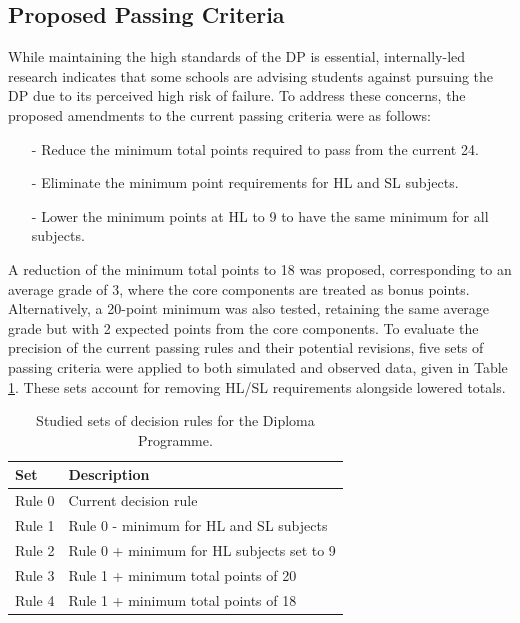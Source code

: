 \documentclass[12pt]{article}
\begin{document}
\subsection{Proposed Passing Criteria}

While maintaining the high standards of the DP is essential, internally-led research indicates that some schools are advising students against pursuing the DP due to its perceived high risk of failure. To address these concerns, the proposed amendments to the current passing criteria were as follows:

\begin{itemize}[itemsep=0pt, parsep=0pt]
    \item[-] Reduce the minimum total points required to pass from the current 24.
    \item[-] Eliminate the minimum point requirements for HL and SL subjects. 
    \item[-] Lower the minimum points at HL to 9 to have the same minimum for all subjects.
\end{itemize}

A reduction of the minimum total points to 18 was proposed, corresponding to an average grade of 3, where the core components are treated as bonus points. Alternatively, a 20-point minimum was also tested, retaining the same average grade but with 2 expected points from the core components. To evaluate the precision of the current passing rules and their potential revisions, five sets of passing criteria were applied to both simulated and observed data, given in Table \ref{tab:Amend}. These sets account for removing HL/SL requirements alongside lowered totals.

\begin{table}[h!]
\centering
\caption{Studied sets of decision rules for the Diploma Programme.}
\label{tab:Amend}
\begin{tabular}{ll}
\hline
\textbf{Set} & \textbf{Description} \\ 
\hline
Rule 0 & Current decision rule \\
Rule 1 & Rule 0 - minimum for HL and SL subjects\\
Rule 2 & Rule 0 + minimum for HL subjects set to 9 \\
Rule 3 & Rule 1 + minimum total points of 20 \\
Rule 4 & Rule 1 + minimum total points of 18 \\
\hline
\end{tabular}
\end{table}
\end{document}
